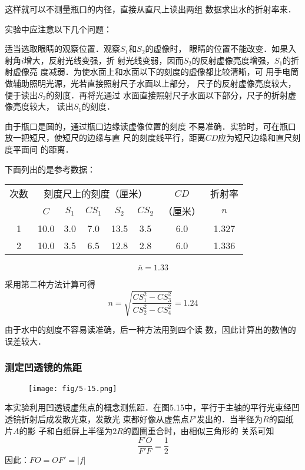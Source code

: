 这样就可以不测量瓶口的内径，直接从直尺上读出两组
数据求出水的折射率来．

实验中应注意以下几个问题：

适当选取眼睛的观察位置．观察$S_1$和$S_2$的虚像时，
眼睛的位置不能改变．如果入射角$i$增大，反射光线变强，折
射光线变弱，因而$S_2$的反射虚像亮度增强，$S_1$的折射虚像亮
度减弱．为使水面上和水面以下的刻度的虚像都比较清晰，可
用手电筒做辅助照明光源，光若直接照射尺子水面以上部分，
尺子的反射虚像亮度较大，便于读出$S_2$的刻度．再将光通过
水面直接照射尺子水面以下部分，尺子的折射虚像亮度较大，
读出$S_1$的刻度．

由于瓶口是圆的，通过瓶口边缘读虚像位置的刻度
不易准确．实验时，可在瓶口放一把短尺，使短尺的边缘与直
尺的刻度线平行，距离$CD$应为短尺边缘和直尺刻度平面间
的距离．

下面列出的是参考数据：
\begin{center}
\begin{tabular}{c|ccccc|c|c}
\hline
次数& \multicolumn{5}{|c|}{刻度尺上的刻度（厘米）}&$CD$& 折射率\\
\cline{2-6}
& $C$&$S_1$&$CS_1$&$S_2$&$CS_2$&  （厘米）& $n$    \\
\hline
1   &    10.0   &    3.0   &    7.0   &    13.5   &    3.5   &    6.0   &    1.327   \\
   2   &    10.0   &    3.5   &    6.5   &    12.8   &    2.8   &    6.0   &    1.336  \\
\hline
\end{tabular}
\[\bar n=1.33\]
\end{center}

采用第二种方法计算可得
\[n=\sqrt{\frac{CS_1^2-CS_3^2}{CS_2^2-CS_4^2}}=1.24\]

由于水中的刻度不容易读准确，后一种方法用到四个读
数，因此计算出的数值的误差较大．

\subsubsection{测定凹透镜的焦距}

\begin{figure}[htp]
    \centering
    \texttt{[image: fig/5-15.png]}
    \caption{}
\end{figure}

本实验利用凹透镜虚焦点的概念测焦距．在图5.15中，平行于主轴的平行光束经凹透镜折射后成发散光束，发散光
束都好像从虚焦点$F'$发出的．当半径为$R$的圆纸片$A$的影
子和白纸屏上半径为$2R$的圆圈重合时，由相似三角形的
关系可知
\[\frac{F'O}{F'F}=\frac{1}{2}\]
因此：$FO=OF'=|f|$

